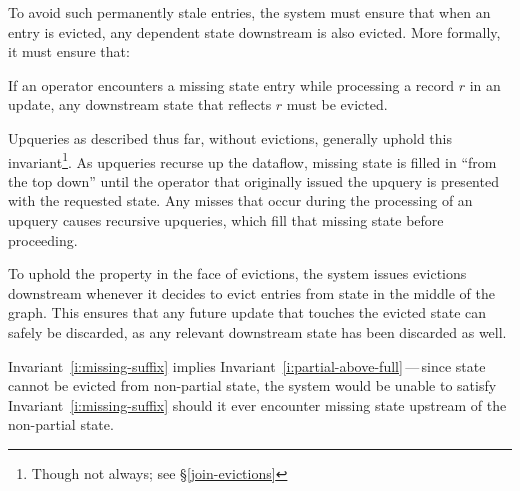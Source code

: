 To avoid such permanently stale entries, the system must ensure that when an
entry is evicted, any dependent state downstream is also evicted. More formally,
it must ensure that:

\begin{invariant}
  \label{i:missing-suffix}
  If an operator encounters a missing state entry while processing a record $r$
  in an update, any downstream state that reflects $r$ must be evicted.
\end{invariant}

Upqueries as described thus far, without evictions, generally uphold this
invariant\footnote{Though not always; see \S\ref{join-evictions}}. As upqueries
recurse up the dataflow, missing state is filled in ``from the top down'' until
the operator that originally issued the upquery is presented with the requested
state. Any misses that occur during the processing of an upquery causes
recursive upqueries, which fill that missing state before proceeding.

To uphold the property in the face of evictions, the system issues evictions
downstream whenever it decides to evict entries from state in the middle of the
graph. This ensures that any future update that touches the evicted state can
safely be discarded, as any relevant downstream state has been discarded as
well.

Invariant~\ref{i:missing-suffix} implies
Invariant~\ref{i:partial-above-full}\,---\,since state cannot be evicted from
non-partial state, the system would be unable to satisfy
Invariant~\ref{i:missing-suffix} should it ever encounter missing state upstream
of the non-partial state.
